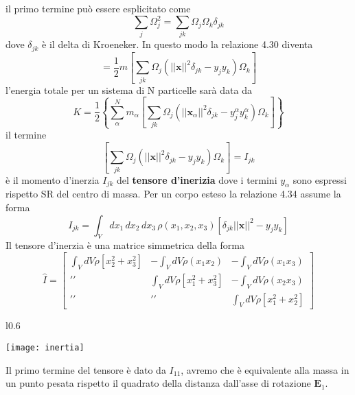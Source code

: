 il primo termine pu\`{o} essere esplicitato come
\begin{equation}
	\sum_{j} \Omega_j^2 = \sum_{jk}\Omega_j \Omega_k \delta_{jk}
\end{equation}
dove $\delta_{jk}$ \`{e} il delta di Kroeneker. In questo modo la relazione 4.30 diventa
\begin{equation}
	=\frac{1}{2}m \left [ \sum_{jk} \Omega_j (||\bm{x}||^2 \delta_{jk} - y_j y_k)\Omega_k\right ]
\end{equation}
l'energia totale per un sistema di N particelle sar\`{a} data da 
\begin{equation}
	K = \frac{1}{2} \left \{\sum_{\alpha}^N m_{\alpha} \left [ \sum_{jk} \Omega_j (||\bm{x}_{\alpha}||^2 \delta_{jk} - y_j^{\alpha} y_k^{\alpha})\Omega_k\right ] \right \}  
\end{equation}
il termine 
\begin{equation}
	\left [ \sum_{jk} \Omega_j (||\bm{x}||^2 \delta_{jk} - y_j y_k)\Omega_k\right ] = I_{jk}
\end{equation}
\`{e} il momento d'inerzia $I_{jk}$ del \textbf{tensore d'inerizia} dove i termini $y_{\alpha}$ sono espressi rispetto SR del centro di massa. Per un corpo esteso la relazione 4.34 assume la forma 
\begin{equation}
	I_{jk} = \int_{V}dx_1\,dx_2\,dx_3\,\rho(x_1,x_2,x_3)\left [  \delta_{jk} ||\bm{x}||^2 - y_jy_k\right ]
\end{equation}
Il tensore d'inerzia \`{e} una matrice simmetrica della forma 
\begin{equation}
\hat{I} = 
\left[\begin{array}{ccc}
\int_V d V \rho\left[x_2^2+x_3^2\right] & -\int_V dV \rho\left(x_1 x_2\right) & -\int_V dV\rho \left(x_1 x_3\right) \\[0.2in]
\prime \prime & \int_V d V \rho\left[x_1^2+x_3^2\right] & -\int_V dV \rho\left(x_2 x_3\right) \\[0.2in]
\prime \prime & \prime \prime & \int_V dV \rho\left[x_1^2+x_2^2\right]
\end{array}\right]
\end{equation}
\begin{wrapfigure}[7]{l}{0.6\textwidth}
  \begin{center}
    \texttt{[image: inertia]}
    \end{center}
\end{wrapfigure}

\vspace{0.3in}
\noindent Il primo termine del tensore \`{e} dato da $I_{11}$, avremo che \`{e} equivalente alla massa in un punto pesata rispetto il quadrato della distanza dall'asse di rotazione $\bm{E}_1$.\newline

